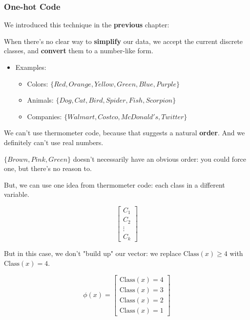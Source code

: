             \subsecdiv
            \subsubsection*{One-hot Code}

                We introduced this technique in the \textbf{previous} chapter:
                
                When there's no clear way to \textbf{simplify} our data, we accept the current discrete classes, and \textbf{convert} them to a number-like form.

                \begin{itemize}
                    \item Examples:
                    \begin{itemize}
                        \item Colors: $\{Red, Orange, Yellow, Green, Blue, Purple\}$
                        \item Animals: $\{Dog, Cat, Bird, Spider, Fish, Scorpion\}$
                        \item Companies: $\{Walmart, Costco, McDonald's, Twitter\}$
                    \end{itemize}
                \end{itemize}

                We can't use thermometer code, because that suggests a natural \textbf{order}. And we definitely can't use real numbers.

                \miniex $\{Brown, Pink, Green\}$ doesn't necessarily have an obvious order: you could force one, but there's no reason to.

                But, we can use one idea from thermometer code: each class in a different variable.
        
                \begin{equation}
                    \begin{bmatrix}
                      C_1\\C_2\\ \vdots \\ C_k
                    \end{bmatrix}
                \end{equation}

                But in this case, we don't "build up" our vector: we replace $\text{Class}(x)\geq 4$ with $\text{Class}(x)= 4$.

                \begin{equation}
                    \phi(x) =
                    \begin{bmatrix}
                        \text{Class}(x) = 4 \\
                        \text{Class}(x) = 3\\
                        \text{Class}(x) = 2\\
                        \text{Class}(x) = 1
                    \end{bmatrix}
                \end{equation}
                
